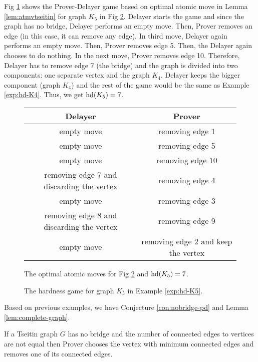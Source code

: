 \documentclass{report}
\begin{document}
\begin{examp}\label{exp:hd-K5}
Fig \ref{fig:game3} shows  the Prover-Delayer game based on optimal atomic move in Lemma \ref{lem:atmvtseitin} for graph $K_5$ in Fig \ref{fig:hd3}. Delayer starts the game and since the graph has no bridge, Delayer performs an empty move. Then, Prover removes an edge (in this case, it can remove any edge). In third move, Delayer again performs an empty move. Then, Prover removes edge 5. Then, the Delayer again chooses to do nothing. In the next move, Prover removes edge 10. Therefore, Delayer has to remove edge 7 (the bridge) and the graph is divided into two components: one separate vertex and the graph $K_4$. Delayer keeps the bigger component (graph $K_4$) and the rest of the game would be the same as Example \ref{exp:hd-K4}. Thus, we get $\operatorname{hd}(K_5)=7$.
  \begin{figure}%
  \centering
  \begin{tabular}{|c|c|} 
  \hline
                  Delayer & Prover \\ \hline
                  empty move & removing edge 1  \\ \hline
		  empty move & removing edge 5  \\ \hline
		  empty move & removing edge 10  \\ \hline
                  removing edge 7 and discarding the vertex & removing edge 4  \\ \hline
		  empty move & removing edge 3  \\ \hline
                  removing edge 8 and discarding the vertex & removing edge 9  \\ \hline
		  empty move & removing edge 2  and keep the vertex\\ \hline
  \end{tabular}
  \caption{The optimal atomic moves for Fig \ref{fig:hd3} and $\operatorname{hd}(K_5)=7$.} \label{fig:game3}
  \end{figure}
  \begin{figure}
  \begin{center}
  \caption{The hardness game for graph $K_5$ in Example \ref{exp:hd-K5}.} \label{fig:hd3}
  \end{center}
  \end{figure}
\end{examp}

Based on previous examples, we have Conjecture \ref{con:nobridge-pd} and Lemma \ref{lem:complete-graph}.
\begin{conj}\label{con:nobridge-pd}
If a Tseitin graph $G$ has no bridge and the number of connected edges to vertices are not equal then Prover chooses the vertex with minimum connected edges and removes one of its connected edges.
\end{conj}
\end{document}
